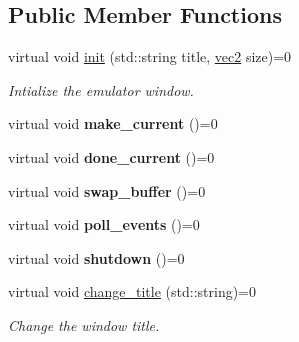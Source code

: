 \subsection*{Public Member Functions}
\begin{DoxyCompactItemize}
\item 
virtual void \mbox{\hyperlink{classeka2l1_1_1driver_1_1emu__window_a5cc29dfd4fd4de6b760bb33442a9a654}{init}} (std\+::string title, \mbox{\hyperlink{structeka2l1_1_1vec2}{vec2}} size)=0
\begin{DoxyCompactList}\small\item\em Intialize the emulator window. \end{DoxyCompactList}\item 
\mbox{\label{classeka2l1_1_1driver_1_1emu__window_acd8fffd8710531560bb156c5b4a63d19}} 
virtual void {\bfseries make\+\_\+current} ()=0
\item 
\mbox{\label{classeka2l1_1_1driver_1_1emu__window_a5afb0d68b5181ed5da0e561c9e1ee586}} 
virtual void {\bfseries done\+\_\+current} ()=0
\item 
\mbox{\label{classeka2l1_1_1driver_1_1emu__window_aa71c803e97a576d342c1c0d2657ca1bd}} 
virtual void {\bfseries swap\+\_\+buffer} ()=0
\item 
\mbox{\label{classeka2l1_1_1driver_1_1emu__window_ab7eff68d58d14467dfaa67f44be036da}} 
virtual void {\bfseries poll\+\_\+events} ()=0
\item 
\mbox{\label{classeka2l1_1_1driver_1_1emu__window_a93feb29a725d6760b3f0803a4181c2ee}} 
virtual void {\bfseries shutdown} ()=0
\item 
\mbox{\label{classeka2l1_1_1driver_1_1emu__window_a308cb841d7f6c9f6a6df03736466438a}} 
virtual void \mbox{\hyperlink{classeka2l1_1_1driver_1_1emu__window_a308cb841d7f6c9f6a6df03736466438a}{change\+\_\+title}} (std\+::string)=0
\begin{DoxyCompactList}\small\item\em Change the window title. \end{DoxyCompactList}\end{DoxyCompactItemize}
